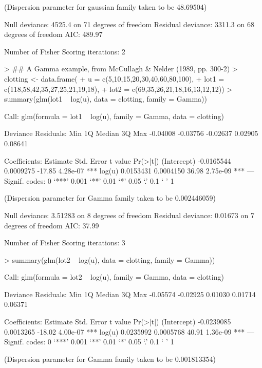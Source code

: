 \documentclass{article}
\begin{document}
\begin{Schunk}
\begin{Soutput}
(Dispersion parameter for gaussian family taken to be 48.69504)

    Null deviance: 4525.4  on 71  degrees of freedom
Residual deviance: 3311.3  on 68  degrees of freedom
AIC: 489.97

Number of Fisher Scoring iterations: 2
\end{Soutput}
\begin{Sinput}
> ## A Gamma example, from McCullagh & Nelder (1989, pp. 300-2)
> clotting <- data.frame(
+   u = c(5,10,15,20,30,40,60,80,100),
+   lot1 = c(118,58,42,35,27,25,21,19,18),
+   lot2 = c(69,35,26,21,18,16,13,12,12))
> summary(glm(lot1 ~ log(u), data = clotting, family = Gamma))
\end{Sinput}
\begin{Soutput}
Call:
glm(formula = lot1 ~ log(u), family = Gamma, data = clotting)

Deviance Residuals: 
     Min        1Q    Median        3Q       Max  
-0.04008  -0.03756  -0.02637   0.02905   0.08641  

Coefficients:
              Estimate Std. Error t value Pr(>|t|)    
(Intercept) -0.0165544  0.0009275  -17.85 4.28e-07 ***
log(u)       0.0153431  0.0004150   36.98 2.75e-09 ***
---
Signif. codes:  0 ‘***’ 0.001 ‘**’ 0.01 ‘*’ 0.05 ‘.’ 0.1 ‘ ’ 1

(Dispersion parameter for Gamma family taken to be 0.002446059)

    Null deviance: 3.51283  on 8  degrees of freedom
Residual deviance: 0.01673  on 7  degrees of freedom
AIC: 37.99

Number of Fisher Scoring iterations: 3
\end{Soutput}
\begin{Sinput}
> summary(glm(lot2 ~ log(u), data = clotting, family = Gamma))
\end{Sinput}
\begin{Soutput}
Call:
glm(formula = lot2 ~ log(u), family = Gamma, data = clotting)

Deviance Residuals: 
     Min        1Q    Median        3Q       Max  
-0.05574  -0.02925   0.01030   0.01714   0.06371  

Coefficients:
              Estimate Std. Error t value Pr(>|t|)    
(Intercept) -0.0239085  0.0013265  -18.02 4.00e-07 ***
log(u)       0.0235992  0.0005768   40.91 1.36e-09 ***
---
Signif. codes:  0 ‘***’ 0.001 ‘**’ 0.01 ‘*’ 0.05 ‘.’ 0.1 ‘ ’ 1

(Dispersion parameter for Gamma family taken to be 0.001813354)


\end{Soutput}
\end{Schunk}
\end{document}
